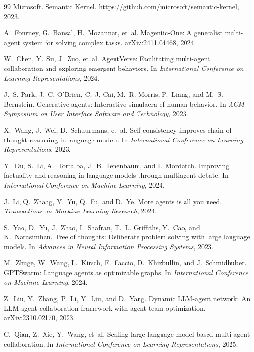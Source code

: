 \documentclass[11pt]{article}
\begin{document}
\begin{thebibliography}{99}
Microsoft.
\newblock Semantic Kernel.
\newblock \url{https://github.com/microsoft/semantic-kernel}, 2023.

A.~Fourney, G.~Bansal, H.~Mozannar, et~al.
\newblock Magentic-One: A generalist multi-agent system for solving complex tasks.
\newblock arXiv:2411.04468, 2024.

W.~Chen, Y.~Su, J.~Zuo, et~al.
\newblock AgentVerse: Facilitating multi-agent collaboration and exploring emergent behaviors.
\newblock In \emph{International Conference on Learning Representations}, 2024.

J.~S. Park, J.~C. O'Brien, C.~J. Cai, M.~R. Morris, P.~Liang, and M.~S. Bernstein.
\newblock Generative agents: Interactive simulacra of human behavior.
\newblock In \emph{ACM Symposium on User Interface Software and Technology}, 2023.

X.~Wang, J.~Wei, D.~Schuurmans, et~al.
\newblock Self-consistency improves chain of thought reasoning in language models.
\newblock In \emph{International Conference on Learning Representations}, 2023.

Y.~Du, S.~Li, A.~Torralba, J.~B. Tenenbaum, and I.~Mordatch.
\newblock Improving factuality and reasoning in language models through multiagent debate.
\newblock In \emph{International Conference on Machine Learning}, 2024.

J.~Li, Q.~Zhang, Y.~Yu, Q.~Fu, and D.~Ye.
\newblock More agents is all you need.
\newblock \emph{Transactions on Machine Learning Research}, 2024.

S.~Yao, D.~Yu, J.~Zhao, I.~Shafran, T.~L. Griffiths, Y.~Cao, and K.~Narasimhan.
\newblock Tree of thoughts: Deliberate problem solving with large language models.
\newblock In \emph{Advances in Neural Information Processing Systems}, 2023.

M.~Zhuge, W.~Wang, L.~Kirsch, F.~Faccio, D.~Khizbullin, and J.~Schmidhuber.
\newblock GPTSwarm: Language agents as optimizable graphs.
\newblock In \emph{International Conference on Machine Learning}, 2024.

Z.~Liu, Y.~Zhang, P.~Li, Y.~Liu, and D.~Yang.
\newblock Dynamic LLM-agent network: An LLM-agent collaboration framework with agent team optimization.
\newblock arXiv:2310.02170, 2023.

C.~Qian, Z.~Xie, Y.~Wang, et~al.
\newblock Scaling large-language-model-based multi-agent collaboration.
\newblock In \emph{International Conference on Learning Representations}, 2025.


\end{thebibliography}
\end{document}
